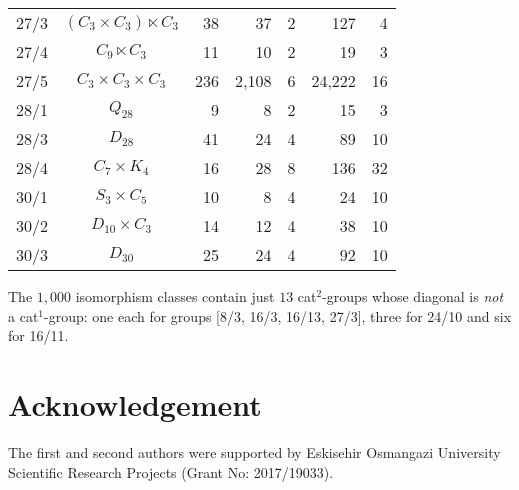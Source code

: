 \documentclass[a4paper,11pt]{article}
\theoremstyle{plain}
\theoremstyle{definition}
\begin{document}
\begin{longtable}{ccrrrrr}
	27/3 & $(C_3 \times C_3) \ltimes C_3$ & 38 & 37 & 2 & 127 & 4 \\ 
	27/4 & $C_9 \ltimes C_3$ & 11 & 10 & 2 & 19 & 3 \\ 
	27/5 & $C_3 \times C_3 \times C_3$ & 236 & 2,108 & 6 & 24,222  & 16 \\ 
	28/1 & $Q_{28}$ & 9 & 8 & 2 & 15 & 3 \\ 
	28/3 & $D_{28}$ & 41 & 24 & 4 & 89 & 10 \\ 
	28/4 & $C_7 \times K_4$ & 16 & 28 & 8 & 136 & 32 \\ 
	30/1 & $S_3 \times C_5$ & 10 & 8 & 4 & 24 & 10 \\ 
	30/2 & $D_{10} \times C_3$ & 14 & 12 & 4 & 38 & 10 \\ 
	30/3 & $D_{30}$ & 25 & 24 & 4 & 92 & 10 \\ 
	\hline
\end{longtable}
The $1,000$ isomorphism classes contain just $13$ cat$^2$-groups 
whose diagonal is \emph{not} a cat$^1$-group: 
one each for groups [8/3, 16/3, 16/13, 27/3], 
three for 24/10 and six for 16/11. 

\section*{Acknowledgement}

The first and second authors were supported by Eskisehir Osmangazi
University Scientific Research Projects (Grant No: 2017/19033).
\end{document}

